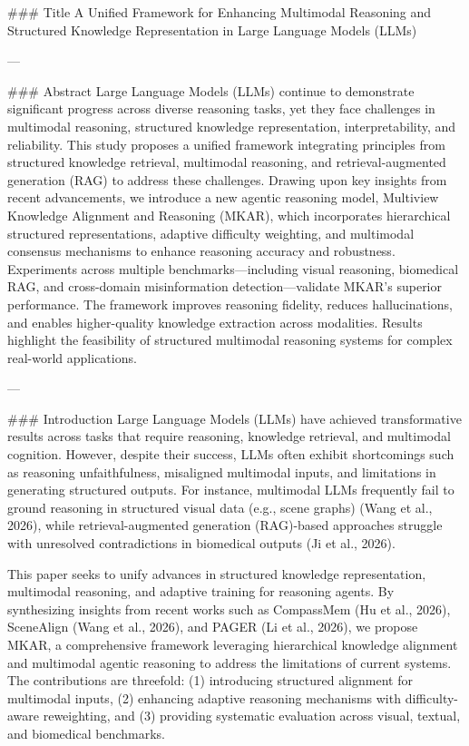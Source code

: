 ### Title
A Unified Framework for Enhancing Multimodal Reasoning and Structured Knowledge Representation in Large Language Models (LLMs)

---

### Abstract
Large Language Models (LLMs) continue to demonstrate significant progress across diverse reasoning tasks, yet they face challenges in multimodal reasoning, structured knowledge representation, interpretability, and reliability. This study proposes a unified framework integrating principles from structured knowledge retrieval, multimodal reasoning, and retrieval-augmented generation (RAG) to address these challenges. Drawing upon key insights from recent advancements, we introduce a new agentic reasoning model, Multiview Knowledge Alignment and Reasoning (MKAR), which incorporates hierarchical structured representations, adaptive difficulty weighting, and multimodal consensus mechanisms to enhance reasoning accuracy and robustness. Experiments across multiple benchmarks—including visual reasoning, biomedical RAG, and cross-domain misinformation detection—validate MKAR's superior performance. The framework improves reasoning fidelity, reduces hallucinations, and enables higher-quality knowledge extraction across modalities. Results highlight the feasibility of structured multimodal reasoning systems for complex real-world applications. 

---

### Introduction
Large Language Models (LLMs) have achieved transformative results across tasks that require reasoning, knowledge retrieval, and multimodal cognition. However, despite their success, LLMs often exhibit shortcomings such as reasoning unfaithfulness, misaligned multimodal inputs, and limitations in generating structured outputs. For instance, multimodal LLMs frequently fail to ground reasoning in structured visual data (e.g., scene graphs) (Wang et al., 2026), while retrieval-augmented generation (RAG)-based approaches struggle with unresolved contradictions in biomedical outputs (Ji et al., 2026).

This paper seeks to unify advances in structured knowledge representation, multimodal reasoning, and adaptive training for reasoning agents. By synthesizing insights from recent works such as CompassMem (Hu et al., 2026), SceneAlign (Wang et al., 2026), and PAGER (Li et al., 2026), we propose MKAR, a comprehensive framework leveraging hierarchical knowledge alignment and multimodal agentic reasoning to address the limitations of current systems. The contributions are threefold: (1) introducing structured alignment for multimodal inputs, (2) enhancing adaptive reasoning mechanisms with difficulty-aware reweighting, and (3) providing systematic evaluation across visual, textual, and biomedical benchmarks.


